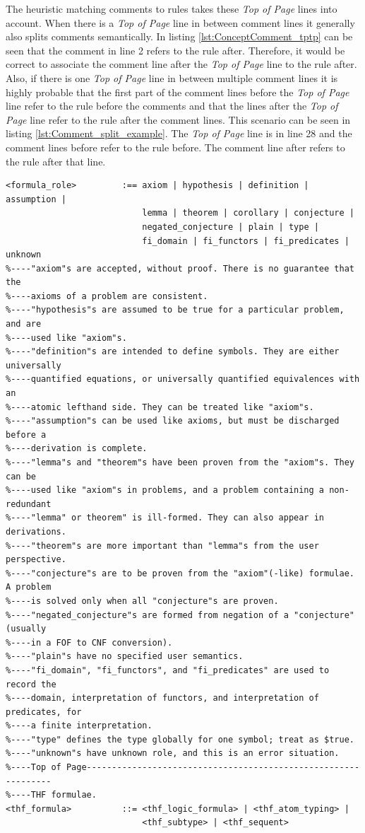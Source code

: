 The heuristic matching comments to rules takes these \textit{Top of Page} lines into account.
When there is a \textit{Top of Page} line in between comment lines it generally also splits comments semantically.
In listing \ref{lst:ConceptComment_tptp} can be seen that the comment in line 2 refers to the rule after.
Therefore, it would be correct to associate the comment line after the \textit{Top of Page} line to the rule after.
Also, if there is one \textit{Top of Page} line in between multiple comment lines it is highly probable that the first part of the comment lines before the \textit{Top of Page} line refer to the rule before the comments and that the lines after the \textit{Top of Page} line refer to the rule after the comment lines.
This scenario can be seen in listing \ref{lst:Comment_split_example}.
The \textit{Top of Page} line is in line 28 and the comment lines before refer to the rule before.
The comment line after refers to the rule after that line.
\begin{lstlisting}[language=none, basicstyle=\scriptsize	,caption=Comment lines split by a \textit{Top of Page} line in the \ac{TPTP} syntax,label= lst:Comment_split_example]
<formula_role>         :== axiom | hypothesis | definition | assumption |
                           lemma | theorem | corollary | conjecture |
                           negated_conjecture | plain | type |
                           fi_domain | fi_functors | fi_predicates | unknown
%----"axiom"s are accepted, without proof. There is no guarantee that the
%----axioms of a problem are consistent.
%----"hypothesis"s are assumed to be true for a particular problem, and are
%----used like "axiom"s.
%----"definition"s are intended to define symbols. They are either universally
%----quantified equations, or universally quantified equivalences with an
%----atomic lefthand side. They can be treated like "axiom"s.
%----"assumption"s can be used like axioms, but must be discharged before a
%----derivation is complete.
%----"lemma"s and "theorem"s have been proven from the "axiom"s. They can be
%----used like "axiom"s in problems, and a problem containing a non-redundant
%----"lemma" or theorem" is ill-formed. They can also appear in derivations.
%----"theorem"s are more important than "lemma"s from the user perspective.
%----"conjecture"s are to be proven from the "axiom"(-like) formulae. A problem
%----is solved only when all "conjecture"s are proven.
%----"negated_conjecture"s are formed from negation of a "conjecture" (usually
%----in a FOF to CNF conversion).
%----"plain"s have no specified user semantics.
%----"fi_domain", "fi_functors", and "fi_predicates" are used to record the
%----domain, interpretation of functors, and interpretation of predicates, for
%----a finite interpretation.
%----"type" defines the type globally for one symbol; treat as $true.
%----"unknown"s have unknown role, and this is an error situation.
%----Top of Page---------------------------------------------------------------
%----THF formulae.
<thf_formula>          ::= <thf_logic_formula> | <thf_atom_typing> |
                           <thf_subtype> | <thf_sequent>
\end{lstlisting}


